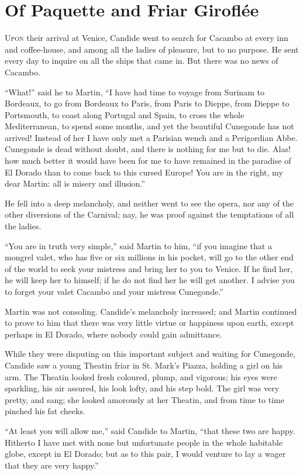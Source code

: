 \chapter{Of Paquette and Friar Giroflée}
\lettrine[lraise=0.1,nindent=0em,slope=-.5em]{U}{pon} their arrival at Venice, Candide went to search for Cacambo at every inn and coffee-house, and among all the ladies of pleasure, but to no purpose. He sent every day to inquire on all the ships that came in. But there was no news of Cacambo.

``What!'' said he to Martin, ``I have had time to voyage from Surinam to Bordeaux, to go from Bordeaux to Paris, from Paris to Dieppe, from Dieppe to Portsmouth, to coast along Portugal and Spain, to cross the whole Mediterranean, to spend some months, and yet the beautiful Cunegonde has not arrived! Instead of her I have only met a Parisian wench and a Perigordian Abbe. Cunegonde is dead without doubt, and there is nothing for me but to die. Alas! how much better it would have been for me to have remained in the paradise of El Dorado than to come back to this cursed Europe! You are in the right, my dear Martin: all is misery and illusion.''

He fell into a deep melancholy, and neither went to see the opera, nor any of the other diversions of the Carnival; nay, he was proof against the temptations of all the ladies.

``You are in truth very simple,'' said Martin to him, ``if you imagine that a mongrel valet, who has five or six millions in his pocket, will go to the other end of the world to seek your mistress and bring her to you to Venice. If he find her, he will keep her to himself; if he do not find her he will get another. I advise you to forget your valet Cacambo and your mistress Cunegonde.''

Martin was not consoling. Candide's melancholy increased; and Martin continued to prove to him that there was very little virtue or happiness upon earth, except perhaps in El Dorado, where nobody could gain admittance.

While they were disputing on this important subject and waiting for Cunegonde, Candide saw a young Theatin friar in St. Mark's Piazza, holding a girl on his arm. The Theatin looked fresh coloured, plump, and vigorous; his eyes were sparkling, his air assured, his look lofty, and his step bold. The girl was very pretty, and sang; she looked amorously at her Theatin, and from time to time pinched his fat cheeks.

``At least you will allow me,'' said Candide to Martin, ``that these two are happy. Hitherto I have met with none but unfortunate people in the whole habitable globe, except in El Dorado; but as to this pair, I would venture to lay a wager that they are very happy.''


